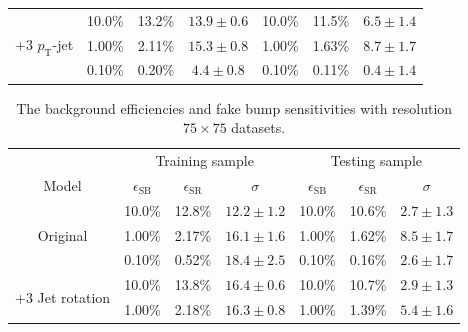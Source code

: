 \documentclass[12pt]{article}
\begin{document}
\begin{table}[htpb]
\begin{tabular}{c|ccc|ccc}
            \multirow{3}{*}{+3 $p_{\text{T}}$-jet} & 10.0\%                 & 13.2\%                 & $13.9 \pm 0.6$ & 10.0\%                 & 11.5\%                 & $6.5 \pm 1.4$  \\
                                                   & 1.00\%                 & 2.11\%                 & $15.3 \pm 0.8$ & 1.00\%                 & 1.63\%                 & $8.7 \pm 1.7$  \\
                                                   & 0.10\%                 & 0.20\%                 & $4.4 \pm 0.8$  & 0.10\%                 & 0.11\%                 & $0.4 \pm 1.4$ 
            \end{tabular}
        \end{table}
        \begin{table}[htpb]
            \centering
            \caption{The background efficiencies and fake bump sensitivities with resolution $75\times 75$ datasets.}
            \label{tab:background_efficiency_in_SR_SB_and_fake_sensitivity_res_75}
            \begin{tabular}{c|ccc|ccc}
                                       & \multicolumn{3}{c|}{Training sample}                             & \multicolumn{3}{c}{Testing sample}                              \\
            Model                                  & $\epsilon_{\text{SB}}$ & $\epsilon_{\text{SR}}$ & $\sigma$       & $\epsilon_{\text{SB}}$ & $\epsilon_{\text{SR}}$ & $\sigma$      \\ \hline
            \multirow{3}{*}{Original}              & 10.0\%                 & 12.8\%                 & $12.2 \pm 1.2$ & 10.0\%                 & 10.6\%                 & $2.7 \pm 1.3$ \\
                                                   & 1.00\%                 & 2.17\%                 & $16.1 \pm 1.6$ & 1.00\%                 & 1.62\%                 & $8.5 \pm 1.7$ \\
                                                   & 0.10\%                 & 0.52\%                 & $18.4 \pm 2.5$ & 0.10\%                 & 0.16\%                 & $2.6 \pm 1.7$ \\ \hline
            \multirow{3}{*}{+3 Jet rotation}       & 10.0\%                 & 13.8\%                 & $16.4 \pm 0.6$ & 10.0\%                 & 10.7\%                 & $2.9 \pm 1.3$ \\
                                                   & 1.00\%                 & 2.18\%                 & $16.3 \pm 0.8$ & 1.00\%                 & 1.39\%                 & $5.4 \pm 1.6$ \\

\end{tabular}
\end{table}
\end{document}
